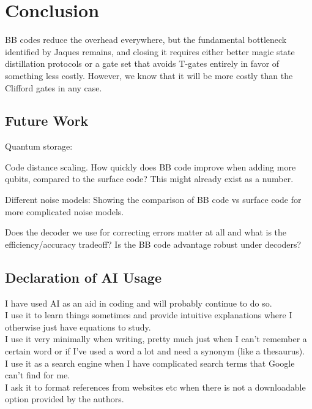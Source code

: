 \chapter{Conclusion}
BB codes reduce the overhead everywhere, but the fundamental bottleneck identified by Jaques remains, and closing it requires either better magic state distillation protocols or a gate set that avoids T-gates entirely in favor of something less costly. However, we know that it will be more costly than the Clifford gates in any case.


\section{Future Work}\label{sec:future_work}
Quantum storage:


Code distance scaling. How quickly does BB code improve when adding more qubits, compared to the surface code? This might already exist as a number.

Different noise models: Showing the comparison of BB code vs surface code for more complicated noise models.

Does the decoder we use for correcting errors matter at all and what is the efficiency/accuracy tradeoff? Is the BB code advantage robust under decoders?

\section{Declaration of AI Usage}
I have used AI as an aid in coding and will probably continue to do so.\\
I use it to learn things sometimes and provide intuitive explanations where I otherwise just have equations to study.\\
I use it very minimally when writing, pretty much just when I can't remember a certain word or if I've used a word a lot and need a synonym (like a thesaurus).\\
I use it as a search engine when I have complicated search terms that Google can't find for me.\\
I ask it to format references from websites etc when there is not a downloadable option provided by the authors.\\